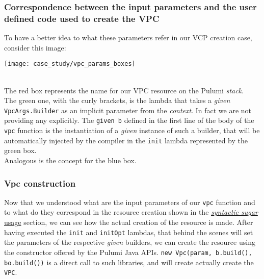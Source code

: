 \subsubsection{Correspondence between the input parameters and the user defined code used to create the VPC}
To have a better idea to what these parameters refer in our VCP creation case, consider this image:
\begin{center}
  \texttt{[image: case\_study/vpc\_params\_boxes]} 
\end{center}\mbox{}\\
The red box represents the name for our VPC resource on the Pulumi \textit{stack}.\\
The green one, with the curly brackets, is the lambda that takes a \textit{given} \texttt{VpcArgs.Builder} as an implicit parameter from the \textit{context}.
In fact we are not providing any explicitly.
The \texttt{given b} defined in the first line of the body of the \texttt{vpc} function is the instantiation of a \textit{given} instance of such a builder, that will be automatically injected by the compiler in the \texttt{init} lambda represented by the green box.\\
Analogous is the concept for the blue box.\\

\subsubsection{Vpc construction}
Now that we understood what are the input parameters of our \texttt{vpc} function and to what do they correspond in the resource creation shown in the \hyperref[ssec:syn-sug-usage]{\textit{syntactic sugar} usage} section, we can see how the actual creation of the resource is made.
After having executed the \texttt{init} and \texttt{initOpt} lambdas, that behind the scenes will set the parameters of the respective \textit{given} builders, we can create the resource using the constructor offered by the Pulumi Java APIs.
\texttt{new Vpc(param, b.build(), bo.build())} is a direct call to such libraries, and will create actually create the \texttt{VPC}.

